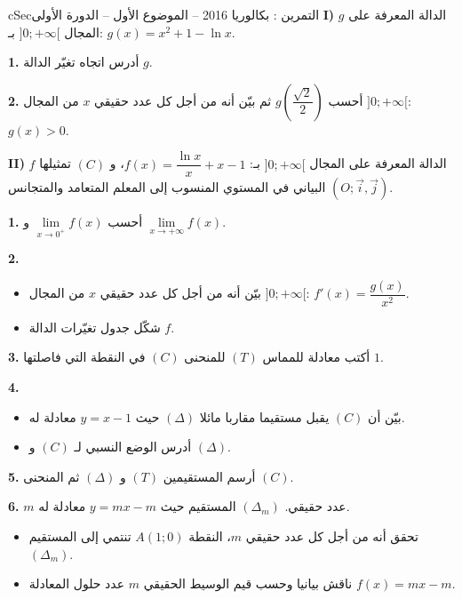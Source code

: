 \documentclass[12pt,a4paper]{article}
\newenvironment{BOX}[2]{\begin{otherlanguage}{english}\begin{arbox}{#1}{#2}}{\end{arbox}\end{otherlanguage}}
\newcounter{exo}
\newenvironment{tamrin}[1]{\stepcounter{exo}\begin{BOX}{cSec}{التمرين \theexo: #1}}{\end{BOX}}
\newenvironment{sq}{\begin{itemize}[leftmargin=2.4em,itemsep=3pt]}{\end{itemize}}
\newcommand{\qa}{\item[(أ)]}\newcommand{\qb}{\item[(ب)]}\newcommand{\qc}{\item[(جـ)]}\newcommand{\qd}{\item[(د)]}\newcommand{\qe}{\item[(هـ)]}
\newcommand{\QQ}[1]{\par\smallskip\textbf{#1.} }
\begin{document}
\begin{tamrin}{بكالوريا 2016 -- الموضوع الأول -- الدورة الأولى}
\textbf{I)} $g$ الدالة المعرفة على المجال $]0;+\infty[$ بـ: $g(x)=x^2+1-\ln x$.
\QQ{1} أدرس اتجاه تغيّر الدالة $g$.
\QQ{2} أحسب $g\left(\dfrac{\sqrt2}{2}\right)$ ثم بيّن أنه من أجل كل عدد حقيقي $x$ من المجال $]0;+\infty[$: $g(x)>0$.

\textbf{II)} $f$ الدالة المعرفة على المجال $]0;+\infty[$ بـ: $f(x)=\dfrac{\ln x}{x}+x-1$،
و $(C)$ تمثيلها البياني في المستوي المنسوب إلى المعلم المتعامد والمتجانس $(O;\vec i,\vec j)$.
\QQ{1} أحسب $\lim\limits_{x\to 0^{+}}f(x)$ و $\lim\limits_{x\to +\infty}f(x)$.
\QQ{2}
\begin{sq}
\qa بيّن أنه من أجل كل عدد حقيقي $x$ من المجال $]0;+\infty[$: $f'(x)=\dfrac{g(x)}{x^2}$.
\qb شكّل جدول تغيّرات الدالة $f$.
\end{sq}
\QQ{3} أكتب معادلة للمماس $(T)$ للمنحنى $(C)$ في النقطة التي فاصلتها $1$.
\QQ{4}
\begin{sq}
\qa بيّن أن $(C)$ يقبل مستقيما مقاربا مائلا $(\Delta)$ حيث $y=x-1$ معادلة له.
\qb أدرس الوضع النسبي لـ $(C)$ و $(\Delta)$.
\end{sq}
\QQ{5} أرسم المستقيمين $(T)$ و $(\Delta)$ ثم المنحنى $(C)$.
\QQ{6} $m$ عدد حقيقي. $(\Delta_m)$ المستقيم حيث $y=mx-m$ معادلة له.
\begin{sq}
\qa تحقق أنه من أجل كل عدد حقيقي $m$، النقطة $A(1;0)$ تنتمي إلى المستقيم $(\Delta_m)$.
\qb ناقش بيانيا وحسب قيم الوسيط الحقيقي $m$ عدد حلول المعادلة $f(x)=mx-m$.
\end{sq}
\end{tamrin}
\end{document}
